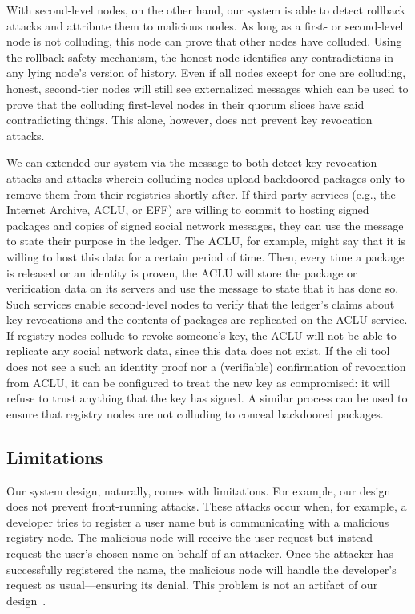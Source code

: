 With second-level nodes, on the other hand, our system is able to detect
rollback attacks and attribute them to malicious nodes. As long as a first- or
second-level node is not colluding, this node can prove that other nodes have
colluded. Using the rollback safety mechanism, the honest node identifies any
contradictions in any lying node's version of history. Even if all nodes except
for one are colluding, honest, second-tier nodes will still see externalized
messages which can be used to prove that the colluding first-level nodes in
their quorum slices have said contradicting things.
This alone, however, does not prevent key revocation attacks.

We can extended our system via the \extensible message to both detect key
revocation attacks and attacks wherein colluding nodes upload backdoored
packages only to remove them from their registries shortly after.
If third-party services (e.g., the Internet Archive, ACLU, or EFF) are willing to commit to hosting signed
packages and copies of signed social network messages, they can use the \extensible message
to state their purpose in the ledger. The ACLU, for example, might say that it is willing
to host this data for a certain period of time. Then, every time a package is
released or an identity is proven, the ACLU will store the package
or verification data on its servers and use the \extensible message to state that it has done
so. Such services enable second-level nodes to verify 
that the ledger's claims about key revocations and the contents of packages are
replicated on the ACLU service. If registry nodes collude to
revoke someone's key, the ACLU will not be able to replicate any
social network data, since this data does not exist. If the \spam{} cli tool does
not see a such an identity proof nor a (verifiable) confirmation of
revocation from ACLU, it can be configured to treat the new key
as compromised: it will refuse to trust anything that the key has signed.
A similar process can be used to ensure that registry nodes are not colluding to
conceal backdoored packages. 

\subsection{Limitations}
Our system design, naturally, comes with limitations.
%
For example, our design does not prevent front-running attacks. These attacks
occur when, for example, a developer tries to register a user name but
is communicating with a malicious registry node. The malicious node
will receive the user request but instead request the user's chosen name
on behalf of an attacker. 
Once the attacker has successfully registered the name, the malicious node will
handle the developer's request as usual---ensuring its denial.
This problem is not an artifact of our design~\cite{frontrunning}.

